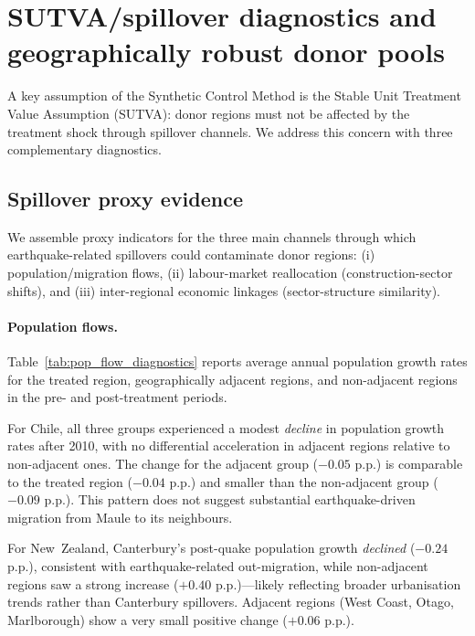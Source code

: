 \documentclass[12pt]{article}
\begin{document}
\newpage

\section{SUTVA/spillover diagnostics and geographically robust donor pools}
\label{sec:spillover_appendix}

A key assumption of the Synthetic Control Method is the Stable Unit Treatment Value Assumption (SUTVA): donor regions must not be affected by the treatment shock through spillover channels. We address this concern with three complementary diagnostics.

\subsection{Spillover proxy evidence}

We assemble proxy indicators for the three main channels through which earthquake-related spillovers could contaminate donor regions: (i) population/migration flows, (ii) labour-market reallocation (construction-sector shifts), and (iii) inter-regional economic linkages (sector-structure similarity).

\paragraph{Population flows.}
Table~\ref{tab:pop_flow_diagnostics} reports average annual population growth rates for the treated region, geographically adjacent regions, and non-adjacent regions in the pre- and post-treatment periods.

For Chile, all three groups experienced a modest \emph{decline} in population growth rates after 2010, with no differential acceleration in adjacent regions relative to non-adjacent ones. The change for the adjacent group ($-0.05$ p.p.) is comparable to the treated region ($-0.04$ p.p.) and smaller than the non-adjacent group ($-0.09$ p.p.). This pattern does not suggest substantial earthquake-driven migration from Maule to its neighbours.

For New~Zealand, Canterbury's post-quake population growth \emph{declined} ($-0.24$ p.p.), consistent with earthquake-related out-migration, while non-adjacent regions saw a strong increase ($+0.40$ p.p.)---likely reflecting broader urbanisation trends rather than Canterbury spillovers. Adjacent regions (West Coast, Otago, Marlborough) show a very small positive change ($+0.06$ p.p.).
\end{document}
